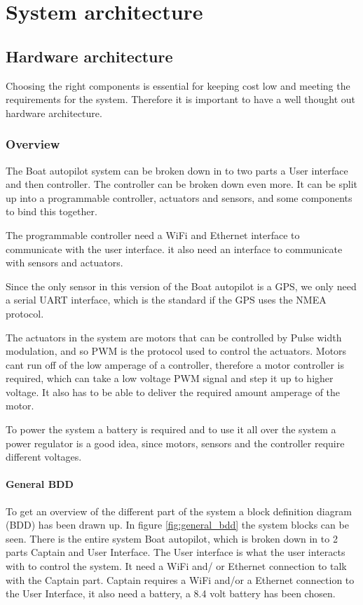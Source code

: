 \chapter{System architecture}



\section{Hardware architecture}
Choosing the right components is essential for keeping cost low and meeting the requirements for the system. Therefore it is important to have a well thought out hardware architecture. 

\subsection{Overview}
The Boat autopilot system can be broken down in to two parts a User interface and then controller.
The controller can be broken down even more. It can be split up into a programmable controller, actuators and sensors, and some components to bind this together.

The programmable controller need a WiFi and Ethernet interface to communicate with the user interface. it also need an interface to communicate with sensors and actuators. 

Since the only sensor in this version of the Boat autopilot is a GPS, we only need a serial UART interface, which is the standard if the GPS uses the NMEA protocol. 

The actuators in the system are motors that can be controlled by Pulse width modulation, and so PWM is the protocol used to control the actuators. Motors cant run off of the low amperage of a controller, therefore a motor controller is required, which can take a low voltage PWM signal and step it up to higher voltage. It also has to be able to deliver the required amount amperage of the motor. 

To power the system a battery is required and to use it all over the system a power regulator is a good idea, since motors, sensors and the controller require different voltages.

\subsubsection{General BDD}

To get an overview of the different part of the system a block definition diagram (BDD) has been drawn up.
In figure \ref{fig:general_bdd} the system blocks can be seen. There is the entire system Boat autopilot, which is broken down in to 2 parts Captain and User Interface. The User interface is what the user interacts with to control the system. It need a WiFi and/ or Ethernet connection to talk with the Captain part. Captain requires a WiFi and/or a Ethernet connection to the User Interface, it also need a battery, a 8.4 volt battery has been chosen. 

